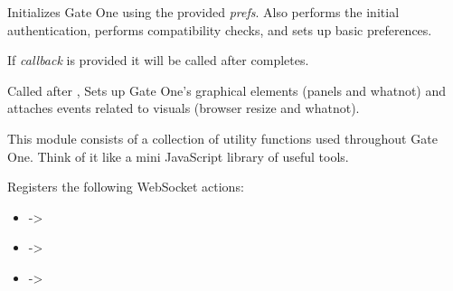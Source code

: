 \documentclass[letterpaper,10pt,openany]{sphinxmanual}
\begin{document}
\begin{fulllineitems}
\begin{fulllineitems}
\end{fulllineitems}



\begin{fulllineitems}
\label{Developer/js_gateone:GateOne.init}
Initializes Gate One using the provided \emph{prefs}.  Also performs the initial authentication, performs compatibility checks, and sets up basic preferences.

If \emph{callback} is provided it will be called after {\hyperref[Developer/js_gateone:GateOne.Net.connect]{}} completes.

\end{fulllineitems}



\begin{fulllineitems}
\label{Developer/js_gateone:GateOne.initialize}
Called after {\hyperref[Developer/js_gateone:GateOne.init]{}}, Sets up Gate One's graphical elements (panels and whatnot) and attaches events related to visuals (browser resize and whatnot).

\end{fulllineitems}



\begin{fulllineitems}
\label{Developer/js_gateone:GateOne.Utils}
This module consists of a collection of utility functions used throughout Gate One.  Think of it like a mini JavaScript library of useful tools.


\begin{fulllineitems}
\label{Developer/js_gateone:GateOne.Utils.init}
Registers the following WebSocket actions:
\begin{itemize}
\item {} 
 -\textgreater{} {\hyperref[Developer/js_gateone:GateOne.Utils.saveAsAction]{}}

\item {} 
 -\textgreater{} {\hyperref[Developer/js_gateone:GateOne.Utils.loadStyleAction]{}}

\item {} 
 -\textgreater{} {\hyperref[Developer/js_gateone:GateOne.Utils.loadJSAction]{}}


\end{itemize}
\end{fulllineitems}
\end{fulllineitems}
\end{fulllineitems}
\end{document}
